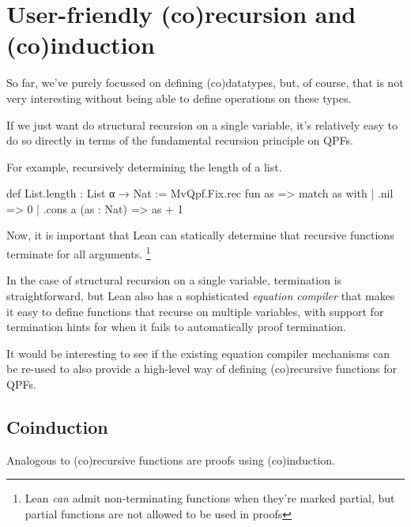 \section{User-friendly (co)recursion and (co)induction}
So far, we've purely focussed on defining (co)datatypes, but, of course, that is not very interesting
without being able to define operations on these types.

If we just want do structural recursion on a single variable, it's relatively easy to do so directly
in terms of the fundamental recursion principle on QPFs.

For example, recursively determining the length of a list.
\begin{leancode}
def List.length : List α → Nat :=
  MvQpf.Fix.rec fun as => match as with
    | .nil                => 0
    | .cons a (as : Nat)  => as + 1 
\end{leancode}

Now, it is important that Lean can statically determine that recursive functions terminate for all 
arguments. \footnote{Lean \emph{can} admit non-terminating functions when they're marked partial, but partial functions are not allowed to be used in proofs}

In the case of structural recursion on a single variable, termination is straightforward, but Lean
also has a sophisticated \emph{equation compiler} that makes it easy to define functions that recurse
on multiple variables, with support for termination hints for when it fails to automatically proof
termination.

It would be interesting to see if the existing equation compiler mechanisms can be re-used
to also provide a high-level way of defining (co)recursive functions for QPFs.

\subsection*{Coinduction}

Analogous to (co)recursive functions are proofs using (co)induction.










